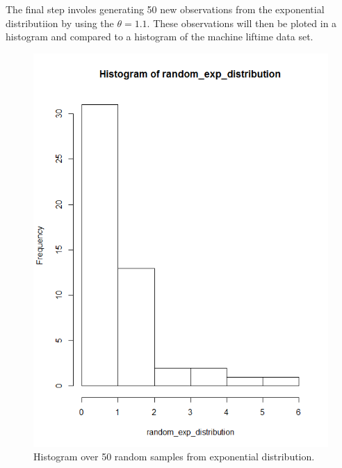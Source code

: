 \documentclass[a4paper,12pt]{article}
\begin{document}
The final step involes generating 50 new observations from the exponential distributiion by using the \(\theta = 1.1\). These observations will then be ploted in a histogram and compared to a histogram of the machine liftime data set.

\begin{figure}[H]
\centering
\begin{minipage}[]{0.4\textwidth}
  \includegraphics[width=\textwidth]{figures/Lab1_A2_hist_exp.png}  
  \caption{Histogram over 50 random samples from exponential distribution.\label{fig:Histogram over 50 random samples from exponential distribution} }
 \end{minipage}
\begin{minipage}[]{0.4\textwidth}

\end{minipage}
\end{figure}
\end{document}
